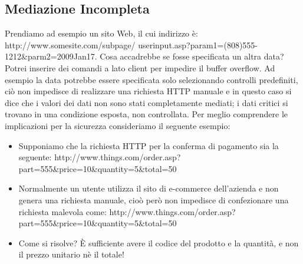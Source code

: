 \subsection{Mediazione Incompleta}
Prendiamo ad esempio un sito Web, il cui indirizzo è:
 http://www.somesite.com/subpage/
  userinput.asp?param1=(808)555-1212\&parm2=2009Jan17.
  \newline
Cosa accadrebbe se fosse specificata un altra data? 
Potrei inserire dei comandi a lato client per impedire il buffer overflow. Ad esempio la data potrebbe essere specificata solo selezionando controlli predefiniti, ciò non impedisce di realizzare una richiesta HTTP manuale e in questo caso si dice che i valori dei dati non sono stati completamente mediati; i dati critici si trovano in una condizione esposta, non controllata.
Per meglio comprendere le implicazioni per la sicurezza consideriamo il seguente esempio:
\begin{itemize}
	\item Supponiamo che la richiesta HTTP per la conferma di pagamento sia la seguente:
	\newline
	http://www.things.com/order.asp?part=555\&price=10\&quantity=5\&total=50
	\item Normalmente un utente utilizza il sito di e-commerce dell'azienda e non genera una richiesta manuale, cioò però non impedisce di confezionare una richiesta malevola come:
	\newline
	http://www.things.com/order.asp?part=555\&price=10\&quantity=5\&total=50
	\item Come si risolve? \`{E} sufficiente avere il codice del prodotto e la quantità, e non il prezzo unitario nè il totale!
\end{itemize}

